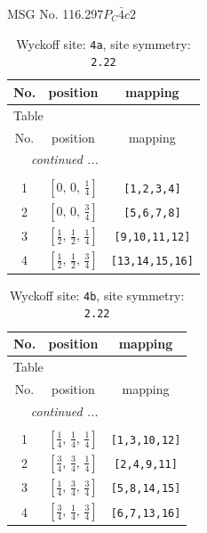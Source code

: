 \documentclass[fleqn,8pt]{jsarticle}
\begin{document}
\setcounter{MaxMatrixCols}{32}

\renewcommand{\tablename}{Table~}
\renewcommand{\figurename}{Figure~}
\begin{center}
\LARGE
MSG No. 116.297\quad$P_{C}\bar{4}c2$
\end{center}
\renewcommand{\arraystretch}{1.2}
\begin{longtable}{ccc}
\caption{Wyckoff site: {\tt 4a}, site symmetry: {\tt 2.22}}
 \\
 \hline \hline
No. & position & mapping \\ \hline \endfirsthead

\multicolumn{2}{l}{\tablename\ \thetable{}} \\
 \hline \hline
No. & position & mapping \\ \hline \endhead

 \hline \hline
\multicolumn{2}{r}{\footnotesize\it continued ...} \\ \endfoot

 \hline \hline
\multicolumn{2}{r}{} \\ \endlastfoot

1 & $\left[ 0,\, 0,\, \frac{1}{4} \right]$ & {\tt [1,2,3,4]} \\ \hline
2 & $\left[ 0,\, 0,\, \frac{3}{4} \right]$ & {\tt [5,6,7,8]} \\ \hline
3 & $\left[ \frac{1}{2},\, \frac{1}{2},\, \frac{1}{4} \right]$ & {\tt [9,10,11,12]} \\ \hline
4 & $\left[ \frac{1}{2},\, \frac{1}{2},\, \frac{3}{4} \right]$ & {\tt [13,14,15,16]} \\
\end{longtable}
\renewcommand{\arraystretch}{1.2}
\begin{longtable}{ccc}
\caption{Wyckoff site: {\tt 4b}, site symmetry: {\tt 2.22}}
 \\
 \hline \hline
No. & position & mapping \\ \hline \endfirsthead

\multicolumn{2}{l}{\tablename\ \thetable{}} \\
 \hline \hline
No. & position & mapping \\ \hline \endhead

 \hline \hline
\multicolumn{2}{r}{\footnotesize\it continued ...} \\ \endfoot

 \hline \hline
\multicolumn{2}{r}{} \\ \endlastfoot

1 & $\left[ \frac{1}{4},\, \frac{1}{4},\, \frac{1}{4} \right]$ & {\tt [1,3,10,12]} \\ \hline
2 & $\left[ \frac{3}{4},\, \frac{3}{4},\, \frac{1}{4} \right]$ & {\tt [2,4,9,11]} \\ \hline
3 & $\left[ \frac{1}{4},\, \frac{3}{4},\, \frac{3}{4} \right]$ & {\tt [5,8,14,15]} \\ \hline
4 & $\left[ \frac{3}{4},\, \frac{1}{4},\, \frac{3}{4} \right]$ & {\tt [6,7,13,16]} \\
\end{longtable}
\end{document}
